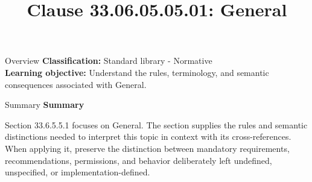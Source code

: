 \documentclass[10pt,letterpaper]{article}
\title{Clause 33.06.05.05.01: General}
\author{}
\date{}
\begin{document}
\maketitle
\begin{CornellOverviewBox}{Overview}
\textbf{Classification:} Standard library - Normative\\[2pt]
\textbf{Learning objective:} Understand the rules, terminology, and semantic consequences associated with General.
\end{CornellOverviewBox}\begin{CornellSummaryBox}{Summary}
{\sffamily\bfseries\color{Accent} Summary}\par\vspace{3pt}Section 33.6.5.5.1 focuses on General. The section supplies the rules and semantic distinctions needed to interpret this topic in context with its cross-references. When applying it, preserve the distinction between mandatory requirements, recommendations, permissions, and behavior deliberately left undefined, unspecified, or implementation-defined.
\end{CornellSummaryBox}
\end{document}
